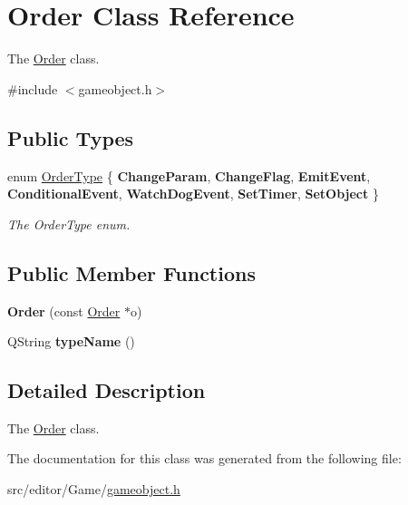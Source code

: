 \hypertarget{class_order}{\section{\-Order \-Class \-Reference}
\label{class_order}
}


\-The \hyperlink{class_order}{\-Order} class.  




{\ttfamily \#include $<$gameobject.\-h$>$}

\subsection*{\-Public \-Types}
\begin{DoxyCompactItemize}
\item 
enum \hyperlink{class_order_aa88b067054a26dd04c2b25b41996b7b0}{\-Order\-Type} \{ \*
{\bfseries \-Change\-Param}, 
{\bfseries \-Change\-Flag}, 
{\bfseries \-Emit\-Event}, 
{\bfseries \-Conditional\-Event}, 
\*
{\bfseries \-Watch\-Dog\-Event}, 
{\bfseries \-Set\-Timer}, 
{\bfseries \-Set\-Object}
 \}
\begin{DoxyCompactList}\small\item\em \-The \-Order\-Type enum. \end{DoxyCompactList}\end{DoxyCompactItemize}
\subsection*{\-Public \-Member \-Functions}
\begin{DoxyCompactItemize}
\item 
\hypertarget{class_order_a04019afa6db1d016268815f9ae34ab1b}{{\bfseries \-Order} (const \hyperlink{class_order}{\-Order} $\ast$o)}\label{class_order_a04019afa6db1d016268815f9ae34ab1b}

\item 
\hypertarget{class_order_ada44c925d18ddf21a6b3e29e5a99d289}{\-Q\-String {\bfseries type\-Name} ()}\label{class_order_ada44c925d18ddf21a6b3e29e5a99d289}

\end{DoxyCompactItemize}


\subsection{\-Detailed \-Description}
\-The \hyperlink{class_order}{\-Order} class. 

\-The documentation for this class was generated from the following file\-:\begin{DoxyCompactItemize}
\item 
src/editor/\-Game/\hyperlink{gameobject_8h}{gameobject.\-h}\end{DoxyCompactItemize}
